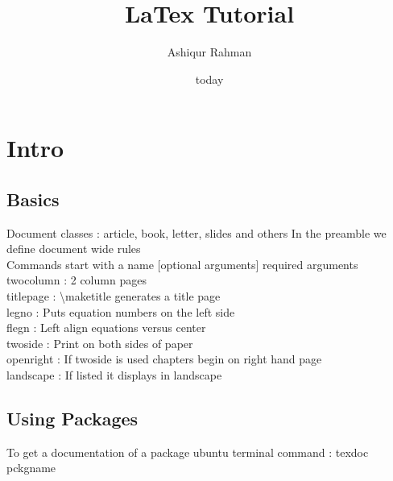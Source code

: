 \documentclass{article}
\begin{document}
\title{\Large{\textbf{LaTex Tutorial}}}
\author{Ashiqur Rahman}	
\date{today}
\maketitle
\tableofcontents
{}

\section{Intro}
\subsection{Basics}
Document classes : article, book, letter, slides and others
In the preamble we define document wide rules\\
Commands start with a name [optional arguments] {required arguments}\\
twocolumn : 2 column pages\\
titlepage : \textbackslash maketitle generates a title page\\
legno : Puts equation numbers on the left side\\
flegn : Left align equations versus center\\
twoside : Print on both sides of paper\\
openright : If twoside is used chapters begin on right hand page\\
landscape : If listed it displays in landscape\\
\subsection{Using Packages}
To get a documentation of a package ubuntu terminal command : texdoc pckgname 
\end{document}
